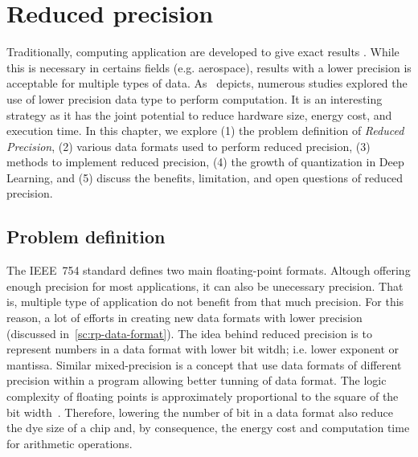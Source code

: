 \chapter{Reduced precision}
\label{ch:reduced-precision}
Traditionally, computing application  are developed to give exact results .
While this is necessary in certains fields (e.g. aerospace), results with a lower
precision is acceptable for multiple types of data.
As~\cite{Cherubin2020-tt} depicts, numerous studies explored the use of lower 
precision data type to perform computation.
It is an interesting strategy as it has the joint potential to reduce hardware 
size, energy cost, and execution time.
In this chapter, we explore (1) the problem definition of \textit{Reduced Precision},
(2) various data formats used to perform reduced precision,
(3) methods to implement reduced precision,
(4) the growth of quantization in Deep Learning,
and (5) discuss the benefits, limitation, and open questions of reduced precision.

\section{Problem definition}
\label{sc:rp-problem-definiton}
The IEEE~754 standard defines two main floating-point formats.
Altough offering enough precision for most applications, it can also be unecessary precision.
That is, multiple type of application do not benefit from that much precision.
For this reason, a lot of efforts in creating new data formats with lower precision (discussed in~\ref{sc:rp-data-format}).
The idea behind reduced precision is to represent numbers in a data format with 
lower bit witdh; i.e. lower exponent or mantissa.
Similar mixed-precision is a concept that use data formats of different precision within a program allowing better tunning of data format.
The logic complexity of floating points is approximately proportional to the square of the bit width~\cite{Chen2018-an}.
Therefore, lowering the number of bit in a data format also reduce the dye size 
of a chip and, by consequence, the energy cost and computation time for arithmetic operations.

